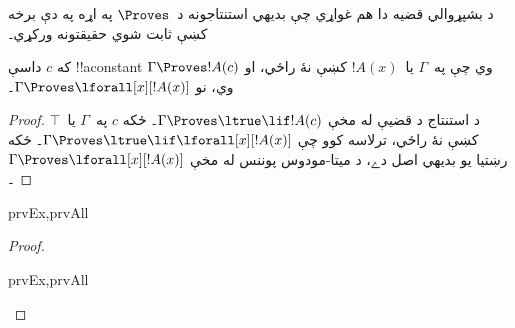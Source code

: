 \documentclass[../../../include/open-logic-section]{subfiles}
\begin{document}


\begin{explain}
  د بشپړوالي قضيه دا هم غواړي چې بديهي استنتاجونه د~$\Proves$ په
  اړه په دې برخه کښې ثابت شوي حقيقتونه ورکړي۔
\end{explain}

\begin{thm}
 که $c$ داسې !!a{constant} وي چې
په~$\Gamma$ يا~$!A(x)$ کښې نۀ راځي، او $\Gamma \Proves !A(c)$ وي،
نو $\Gamma \Proves \lforall[x][!A(x)]$۔
\end{thm}

\begin{proof}
د استنتاج د قضیې له مخې $\Gamma \Proves \ltrue \lif !A(c)$۔ ځکه
$c$ په~$\Gamma$ يا~$\top$ کښې نۀ راځي، ترلاسه کوو چې
$\Gamma \Proves \ltrue \lif \lforall[x][!A(x)]$۔ ځکه رښتيا يو
بديهي اصل دے، د ميتا-مودوس پوننس له مخې
$\Gamma \Proves \lforall[x][!A(x)]$۔
\end{proof}

\begin{prop}
\begin{tagenumerate}{prvEx,prvAll}

\end{tagenumerate}
\end{prop}

\begin{proof}
\begin{tagenumerate}{prvEx,prvAll}
\end{tagenumerate}
\end{proof}
\end{document}
